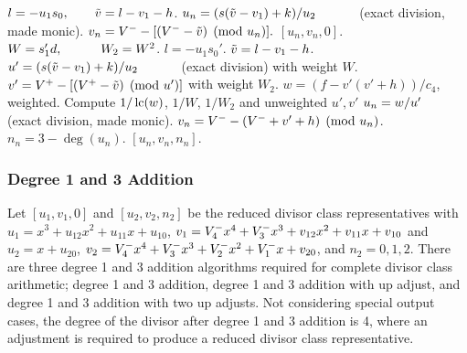 \begin{algorithm}[H]
\begin{algorithmic} [1]
        \State $l = -u_1s_0, \quad\quad \tilde{v} = l - v_1 - h$.
        \State $u_n = (s(\tilde{v} - v_1) + k)/u_2 \quad\quad\quad$ (exact division, made monic).
        \State $v_n = V^{-} - [(V^{-} - \tilde{v}) \pmod{u_n}].$
        \State \Return $[u_n,v_n,0]$.
    \EndIf
\EndIf
\State $W = s_1'd, \quad\quad\quad W_2 = W^2$.
\State $l = -u_1s_0'$.
\State $\tilde{v} = l - v_1 - h$.
\State $u' = (s(\tilde{v} - v_1) + k)/u_2 \quad\quad\quad$ (exact division) with weight $W$.
\State $v' = V^{+} - [(V^{+} - \tilde{v}) \pmod{u'}]$  with weight $W_2$.
\State $w = (f - v'(v' + h))/c_4$, weighted.
\State Compute $1/\operatorname{lc}(w)$, $1/W$, $1/W_2$ and unweighted $u',v'$
\State $u_n = w/u' \quad\quad\quad$ (exact division, made monic).
\State $v_n = V^{-} - (V^{-} + v' + h) \pmod{u_n}$.
\State $n_n = 3 - \deg(u_n)$.
\State \Return $[u_n,v_n,n_n]$.
\vspace{-2pt}
\end{algorithmic}
\end{algorithm}


\newpage



\subsubsection{Degree 1 and 3 Addition}
Let $[u_1,v_1,0]$ and $[u_2,v_2,n_2]$ be the reduced divisor class representatives
with $u_1 = x^3 + u_{12}x^2 + u_{11}x + u_{10}$, $v_1 = V^{-}_4x^4 + V^{-}_3x^3
+ v_{12}x^2 + v_{11}x + v_{10}$ and $u_2 = x + u_{20}$, $v_2 = V^{-}_4x^4 +
V^{-}_3x^3 + V^{-}_2x^2 + V^{-}_1x + v_{20}$, and $n_2 = 0,1,2$. There are three
degree 1 and 3 addition algorithms required for complete divisor class
arithmetic; degree 1 and 3 addition, degree 1 and 3 addition with up adjust, and
degree 1 and 3 addition with two up adjusts. Not considering special output
cases, the degree of the divisor after degree 1 and 3 addition is 4, where an
adjustment is required to produce a reduced divisor class representative.

